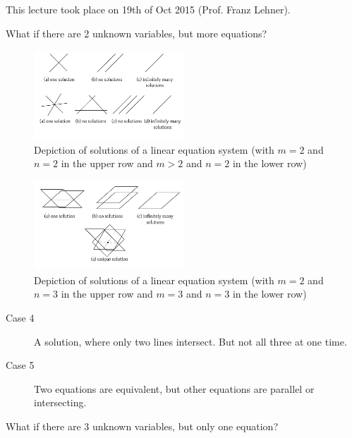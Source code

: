 \documentclass[a4paper,landscape,twocolumn]{article}
\newcommand\meta[3]{This #1 took place on #2 (#3).\par}
\begin{document}
\meta{lecture}{19th of Oct 2015}{Prof. Franz Lehner}

What if there are 2 unknown variables, but more equations?
%
\begin{figure}[t]
  \begin{center}
    \includegraphics[width=0.5\textwidth]{img/linear_equation_visualization.pdf}
    \caption{
      Depiction of solutions of a linear equation system
      (with $m=2$ and $n=2$ in the upper row and $m>2$ and $n=2$ in the lower row)
    }
    \label{img:lineqsys-solutions}
  \end{center}
\end{figure}

\begin{figure}[t]
  \begin{center}
    \includegraphics[width=0.5\textwidth]{img/linear_equation_visualization2.pdf}
    \caption{
      Depiction of solutions of a linear equation system
      (with $m=2$ and $n=3$ in the upper row and $m=3$ and $n=3$ in the lower row)
    }
    \label{img:lineqsys-solutions2}
  \end{center}
\end{figure}

\begin{description}
  \item[Case 4]
    A solution, where only two lines intersect. But not all three at one time.
  \item[Case 5]
    Two equations are equivalent, but other equations are parallel or intersecting.
\end{description}

What if there are 3 unknown variables, but only one equation?
\end{document}
